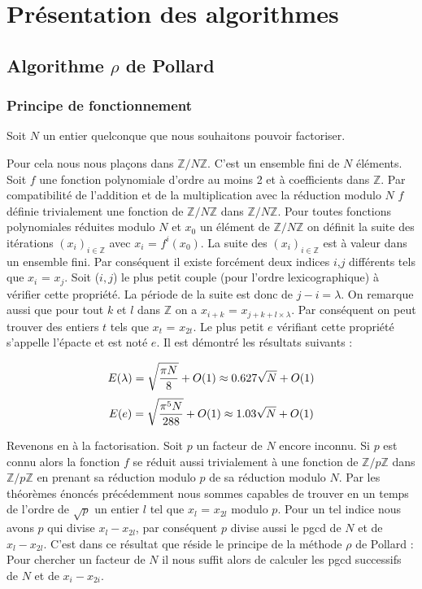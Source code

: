 \documentclass[10pt,a4paper]{report}
\begin{document}
\chapter{Présentation des algorithmes}
\section{Algorithme $\rho$ de Pollard}
\subsection{Principe de fonctionnement}

 




	Soit $N$ un entier quelconque que nous souhaitons pouvoir factoriser.
	
	Pour cela nous nous plaçons dans $\mathbb{Z}/N\mathbb{Z}$. C'est un ensemble fini de $N$ éléments. Soit $f$ une fonction polynomiale d'ordre au moins 2 et à coefficients dans  $\mathbb{Z}$. Par compatibilité de l'addition et de la multiplication avec la réduction modulo $N$ $f$ définie trivialement une fonction de $\mathbb{Z}/N\mathbb{Z}$ dans $\mathbb{Z}/N\mathbb{Z}$. Pour toutes fonctions polynomiales réduites modulo $N$ et $x_0$ un élément de $\mathbb{Z}/N\mathbb{Z}$ on définit la suite des itérations  $(x_i)_{i \in \mathbb{Z}}$ avec $x_i$ = $f^i(x_0)$. La suite des $(x_i)_{i \in \mathbb{Z}}$ est à valeur dans un ensemble fini. Par conséquent il existe forcément deux indices $i$,$j$ différents tels que $x_i$ = $x_j$. Soit ($i,j$) le plus petit couple (pour l'ordre lexicographique) à vérifier cette propriété. La période de la suite est donc de $j-i = \lambda$. On remarque aussi que pour tout $k$ et $l$ dans $\mathbb{Z}$ on a $x_{i+k}$ = $x_{j+k+l \times \lambda}$. Par conséquent on peut trouver des entiers $t$ tels que $x_t$ = $x_{2t}$. Le plus petit $e$ vérifiant cette propriété s'appelle l'épacte et est noté $e$. Il est démontré les résultats suivants :
	
\begin{equation}
	E(\lambda) = \sqrt { \pi N \over 8 } + O(1) \approx 0.627 \sqrt N + O(1)
\end{equation}	
\begin{equation}
	E(e) = \sqrt { \pi^5 N \over 288 } + O(1) \approx 1.03 \sqrt N + O(1)
\end{equation}	
	
	
	
	Revenons en à la factorisation. Soit $p$ un facteur de $N$ encore inconnu. Si $p$ est connu alors la fonction $f$ se réduit aussi trivialement à une fonction de $\mathbb{Z}/p\mathbb{Z}$ dans $\mathbb{Z}/p\mathbb{Z}$ en prenant sa réduction modulo $p$ de sa réduction modulo $N$. Par les théorèmes énoncés précédemment nous sommes capables de trouver en un temps de l'ordre de $ \sqrt p$ un entier $l$ tel que $x_l$ = $x_{2l}$ modulo $p$. Pour un tel indice nous avons $p$ qui divise $x_l-x_{2l}$, par conséquent $p$ divise aussi le pgcd de $N$ et de $x_l-x_{2l}$. C'est dans ce résultat que réside le principe de la méthode $\rho$ de Pollard : Pour chercher un facteur de $N$ il nous suffit alors de calculer les pgcd successifs de $N$ et de $x_i-x_{2i}$.
	
\end{document}
